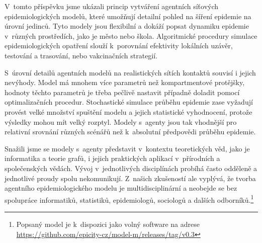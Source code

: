 V~tomto příspěvku jsme ukázali princip vytváření agentních síťových epidemiologických modelů, které umožňují detailní pohled na šíření epidemie na úrovní jedinců. Tyto modely jsou flexibilní a dokáží popsat dynamiku  epidemie v~různých prostředích, jako je město nebo škola. Algoritmické procedury simulace epidemiologických opatření slouží k~porovnání efektivity lokálních uzávěr, testování a trasování, nebo vakcinačních strategií. 

S~úrovní detailů agentních modelů na realistických sítích kontaktů souvisí i jejich nevýhody. Model má mnohem více parametrů než kompartmentové protějšky, hodnoty těchto parametrů je třeba pečlivě nastavit případně doladit pomocí optimalizačních procedur. Stochastické simulace průběhu epidemie zase vyžadují provést velké množství spuštění modelu a jejich statistické vyhodnocení, protože výsledky mohou mít velký rozptyl. Modely s~agenty jsou tak vhodnější pro relativní srovnání různých scénářů než k~absolutní předpovědi průběhu epidemie. 

Snažili jsme se modely s~agenty představit v~kontextu teoretických věd, jako je informatika a teorie grafů, i jejich praktických aplikací v~přírodních a společenských vědách. Vývoj v~jednotlivých disciplínách probíhá často odděleně a jednotlivé proudy spolu nekomunikují. Z~našich zkušeností ale vyplývá, že tvorba agentního epidemiologického modelu je multidisciplinární a neobejde se bez spolupráce informatiků, statistiků, epidemiologů, sociologů a dalších odborníků.\footnote{Popsaný model je k~dispozici jako volný software na adrese \url{https://github.com/epicity-cz/model-m/releases/tag/v0.3}} 
